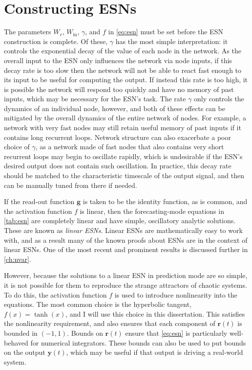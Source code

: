\section{Constructing ESNs}\label{sec:esn-construction}

The parameters $W_r$, $W_\text{in}$, $\gamma$, and $f$ in
\cref{eq:esn} must be set before the ESN construction is complete. Of
these, $\gamma$ has the most simple interpretation: it controls the
exponential decay of the value of each node in the network. As the
overall input to the ESN only influences the network via node inputs,
if this decay rate is too slow then the network will not be able to
react fast enough to its input to be useful for computing the
output. If instead this rate is too high, it is possible the network
will respond too quickly and have no memory of past inputs, which may
be necessary for the ESN's task.  The rate $\gamma$ only controls the
dynamics of an individual node, however, and both of these effects can
be mitigated by the overall dynamics of the entire network of
nodes. For example, a network with very fast nodes may still retain
useful memory of past inputs if it contains long recurrent
loops. Network structure can also exacerbate a poor choice of
$\gamma$, as a network made of fast nodes that also contains very
short recurrent loops may begin to oscillate rapidly, which is
undesirable if the ESN's desired output does not contain such
oscillation.  In practice, this decay rate should be matched to the
characteristic timescale of the output signal, and then can be
manually tuned from there if needed.

If the read-out function $\bm{g}$ is taken to be the identity
function, as is common, and the activation function $f$ is linear,
then the forecasting-mode equations in \cref{tab:esn} are completely
linear and have simple, oscillatory analytic solutions. These are
known as \emph{linear ESNs}. Linear ESNs are mathematically easy to work
with, and as a result many of the known proofs about ESNs are in the
context of linear ESNs. One of the most recent and prominent results is
discussed further in \cref{ch:nvar}.

However, because the solutions to a linear ESN in prediction mode are
so simple, it is not possible for them to reproduce the strange
attractors of chaotic systems. To do this, the activation function $f$
is used to introduce nonlinearity into the equations. The most common
choice is the hyperbolic tangent, $f(x) = \tanh(x)$, and I will use this choice
in this dissertation. This satisfies the nonlinearity requirement, and
also ensures that each component of $\bm{r}(t)$ is bounded in $(-1,
1)$. Bounds on $\bm{r}(t)$ ensure that \cref{eq:esn} is particularly
well-behaved for numerical integrators. These bounds can also be used
to put bounds on the output $\bm{y}(t)$, which may be useful if that
output is driving a real-world system.

